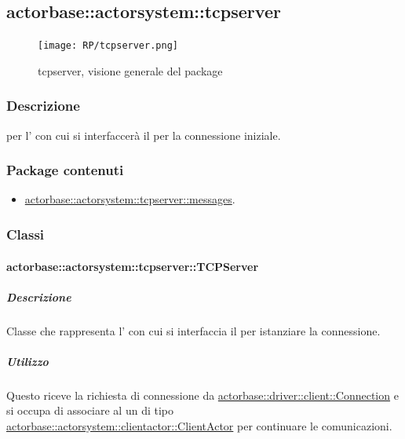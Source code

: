 \documentclass{scalatekids-article}
\begin{document}
\subsection{actorbase::actorsystem::tcpserver}
\label{sec:actorbase::actorsystem::tcpserver}

\begin{figure}[H]
  \begin{center}
    \texttt{[image: RP/tcpserver.png]}
    \caption{tcpserver, visione generale del package}
  \end{center}
\end{figure}

\subsubsection{Descrizione}

 per l' con cui si interfaccerà il  per la connessione iniziale.

\subsubsection{Package contenuti}

\begin{itemize}
\item \hyperref[sec:actorbase::actorsystem::tcpserver::messages]{actorbase::actorsystem::tcpserver::messages}.
\end{itemize}

\subsubsection{Classi}

\paragraph{actorbase::actorsystem::tcpserver::TCPServer}
\label{sec:actorbase::actorsystem::tcpserver::TCPServer}

\subparagraph{Descrizione}

Classe che rappresenta l' con cui si interfaccia il  per
istanziare la connessione.

\subparagraph{Utilizzo}

Questo  riceve la richiesta di connessione da
\hyperref[sec:actorbase::driver::client::Connection]{actorbase::driver::client::Connection}
e si occupa di associare al  un  di tipo
\hyperref[sec:actorbase::actorsystem::clientactor::ClientActor]{actorbase::actorsystem::clientactor::ClientActor}
per continuare le comunicazioni.
\end{document}
